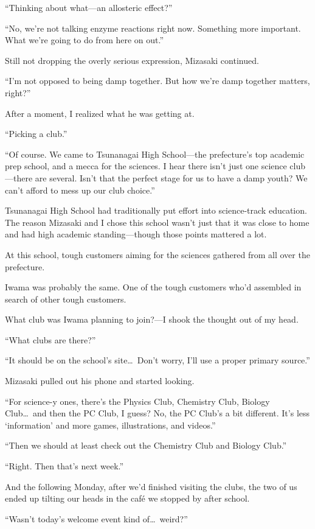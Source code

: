 \documentclass[
    a4paper,
    12pt,
    twoside,
    openany,
    UTF8,
    fontset=windows
]{ctexbook}
\begin{document}
``Thinking about what---an allosteric effect?''

``No, we're not talking enzyme reactions right now. Something more important. What we're going to do from here on out.''

Still not dropping the overly serious expression, Mizasaki continued.

``I'm not opposed to being damp together. But how we're damp together matters, right?''

After a moment, I realized what he was getting at.

``Picking a club.''

``Of course. We came to Tsunanagai High School---the prefecture's top academic prep school, and a mecca for the sciences. I hear there isn't just one science club---there are several. Isn't that the perfect stage for us to have a damp youth? We can't afford to mess up our club choice.''

Tsunanagai High School had traditionally put effort into science-track education. The reason Mizasaki and I chose this school wasn't just that it was close to home and had high academic standing---though those points mattered a lot.

At this school, tough customers aiming for the sciences gathered from all over the prefecture.

Iwama was probably the same. One of the tough customers who'd assembled in search of other tough customers.

What club was Iwama planning to join?---I shook the thought out of my head.

``What clubs are there?''

``It should be on the school's site\dots\ Don't worry, I'll use a proper primary source.''

Mizasaki pulled out his phone and started looking.

``For science-y ones, there's the Physics Club, Chemistry Club, Biology Club\dots\ and then the PC Club, I guess? No, the PC Club's a bit different. It's less `information' and more games, illustrations, and videos.''

``Then we should at least check out the Chemistry Club and Biology Club.''

``Right. Then that's next week.''

And the following Monday, after we'd finished visiting the clubs, the two of us ended up tilting our heads in the caf\'e we stopped by after school.

``Wasn't today's welcome event kind of\dots\ weird?''
\end{document}
